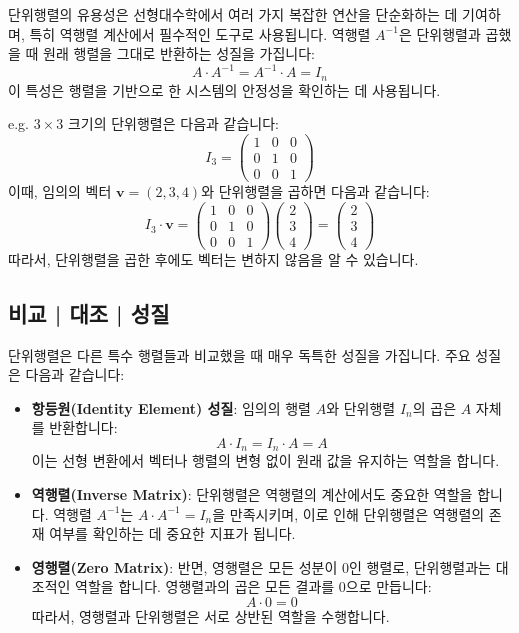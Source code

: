 \noindent 단위행렬의 유용성은 선형대수학에서 여러 가지 복잡한 연산을 단순화하는 데 기여하며, 특히 역행렬 계산에서 필수적인 도구로 사용됩니다. 역행렬 \(A^{-1}\)은 단위행렬과 곱했을 때 원래 행렬을 그대로 반환하는 성질을 가집니다:
\[
  A \cdot A^{-1} = A^{-1} \cdot A = I_n
\]
이 특성은 행렬을 기반으로 한 시스템의 안정성을 확인하는 데 사용됩니다.

\vspace{1\baselineskip}
\noindent {} e.g. \(3 \times 3\) 크기의 단위행렬은 다음과 같습니다:
\[
  I_3 = \begin{pmatrix}
    1 & 0 & 0 \\
    0 & 1 & 0 \\
    0 & 0 & 1
  \end{pmatrix}
\]
이때, 임의의 벡터 \(\mathbf{v} = (2, 3, 4)\)와 단위행렬을 곱하면 다음과 같습니다:
\[
  I_3 \cdot \mathbf{v} = \begin{pmatrix}
    1 & 0 & 0 \\
    0 & 1 & 0 \\
    0 & 0 & 1
  \end{pmatrix}
  \begin{pmatrix}
    2 \\
    3 \\
    4
  \end{pmatrix}
  = \begin{pmatrix}
    2 \\
    3 \\
    4
  \end{pmatrix}
\]
따라서, 단위행렬을 곱한 후에도 벡터는 변하지 않음을 알 수 있습니다.

\subsection{비교 | 대조 | 성질}
단위행렬은 다른 특수 행렬들과 비교했을 때 매우 독특한 성질을 가집니다. 주요 성질은 다음과 같습니다:

\begin{itemize}
  \item \textbf{항등원(Identity Element) 성질}: 임의의 행렬 \(A\)와 단위행렬 \(I_n\)의 곱은 \(A\) 자체를 반환합니다:
        \[
          A \cdot I_n = I_n \cdot A = A
        \]
        이는 선형 변환에서 벡터나 행렬의 변형 없이 원래 값을 유지하는 역할을 합니다.

  \item \textbf{역행렬(Inverse Matrix)}: 단위행렬은 역행렬의 계산에서도 중요한 역할을 합니다. 역행렬 \(A^{-1}\)는 \(A \cdot A^{-1} = I_n\)을 만족시키며, 이로 인해 단위행렬은 역행렬의 존재 여부를 확인하는 데 중요한 지표가 됩니다.

  \item \textbf{영행렬(Zero Matrix)}: 반면, 영행렬은 모든 성분이 0인 행렬로, 단위행렬과는 대조적인 역할을 합니다. 영행렬과의 곱은 모든 결과를 0으로 만듭니다:
        \[
          A \cdot 0 = 0
        \]
        따라서, 영행렬과 단위행렬은 서로 상반된 역할을 수행합니다.
\end{itemize}

